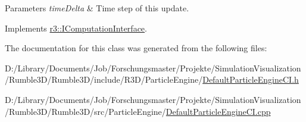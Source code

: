 \begin{DoxyParams}{Parameters}
{\em time\+Delta} & Time step of this update. \\
\hline
\end{DoxyParams}


Implements \mbox{\hyperlink{classr3_1_1_i_computation_interface_aaa12bcc35005f32a1984b38de97696cb}{r3\+::\+I\+Computation\+Interface}}.



The documentation for this class was generated from the following files\+:\begin{DoxyCompactItemize}
\item 
D\+:/\+Library/\+Documents/\+Job/\+Forschungsmaster/\+Projekte/\+Simulation\+Visualization/\+Rumble3\+D/\+Rumble3\+D/include/\+R3\+D/\+Particle\+Engine/\mbox{\hyperlink{_default_particle_engine_c_i_8h}{Default\+Particle\+Engine\+C\+I.\+h}}\item 
D\+:/\+Library/\+Documents/\+Job/\+Forschungsmaster/\+Projekte/\+Simulation\+Visualization/\+Rumble3\+D/\+Rumble3\+D/src/\+Particle\+Engine/\mbox{\hyperlink{_default_particle_engine_c_i_8cpp}{Default\+Particle\+Engine\+C\+I.\+cpp}}\end{DoxyCompactItemize}
